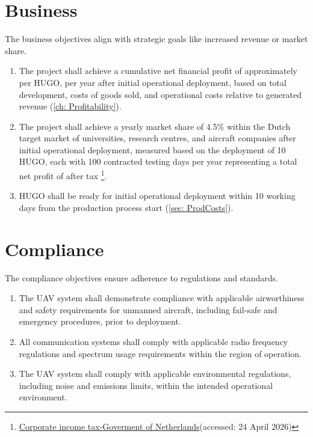 \section{Business}
The business objectives align with strategic goals like increased revenue or market share.

\begin{enumerate}
    \item The project shall achieve a cumulative net financial profit of approximately  per HUGO, per year after initial operational deployment, based on total development, costs of goods sold, and operational costs relative to generated revenue (\autoref{ch: Profitability}).

    \item The project shall achieve a yearly market share of 4.5\% within the Dutch target market of universities, research centres, and aircraft companies after initial operational deployment, measured based on the deployment of 10 HUGO, each with 100 contracted testing days per year representing a total net profit of  after tax \footnote{\href{https://www.government.nl/topics/taxation-and-businesses/corporation-tax}{Corporate income tax-Goverment of Netherlands}(accessed: 24 April 2026)}.

    \item HUGO shall be ready for initial operational deployment within 10 working days from the production process start (\autoref{sec: ProdCosts}).
    
\end{enumerate}

\section{Compliance}
The compliance objectives ensure adherence to regulations and standards.

\begin{enumerate}
    \item The UAV system shall demonstrate compliance with applicable airworthiness and safety requirements for unmanned aircraft, including fail-safe and emergency procedures, prior to deployment.

    \item All communication systems shall comply with applicable radio frequency regulations and spectrum usage requirements within the region of operation.

    \item The UAV system shall comply with applicable environmental regulations, including noise and emissions limits, within the intended operational environment.

\end{enumerate}


